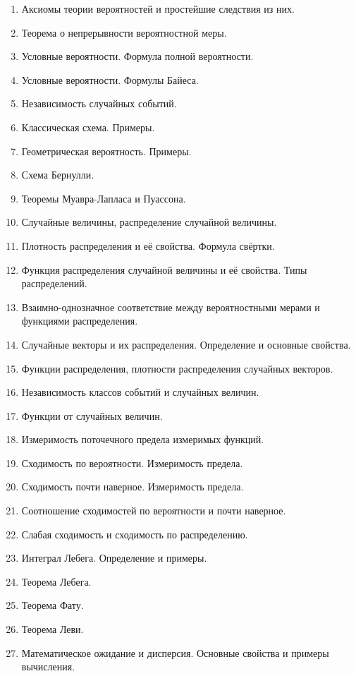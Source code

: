 \documentclass[a4paper]{article}
\theoremstyle{definition}
\theoremstyle{remark}
\begin{document}
\begin{enumerate}
    \item Аксиомы теории вероятностей и простейшие следствия из них.
    \item Теорема о непрерывности вероятностной меры.
    \item Условные вероятности. Формула полной вероятности.
    \item Условные вероятности. Формулы Байеса.
    \item Независимость случайных событий. 
    \item Классическая схема. Примеры. 
    \item Геометрическая вероятность. Примеры.
    \item Схема Бернулли. 
    \item Теоремы Муавра-Лапласа и Пуассона.
    \item Случайные величины, распределение случайной величины.
    \item Плотность распределения и её свойства. Формула свёртки.
    \item Функция распределения случайной величины и её свойства. Типы распределений.
    \item Взаимно-однозначное соответствие между вероятностными мерами и функциями распределения. 
    \item Случайные векторы и их распределения. Определение и основные свойства.
    \item Функции распределения, плотности распределения случайных векторов.
    \item Независимость классов событий и случайных величин. 
    \item Функции от случайных величин.
    \item Измеримость поточечного предела измеримых функций.
    \item Сходимость по вероятности. Измеримость предела.
    \item Сходимость почти наверное. Измеримость предела.
    \item Соотношение сходимостей по вероятности и почти наверное.
    \item Слабая сходимость и сходимость по распределению.
    \item Интеграл Лебега. Определение и примеры.
    \item Теорема Лебега.
    \item Теорема Фату.
    \item Теорема Леви.
    \item Математическое ожидание и дисперсия. Основные свойства и примеры вычисления.

\end{enumerate}
\end{document}
